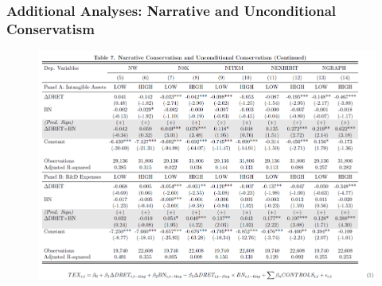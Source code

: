 \documentclass{beamer}
\begin{document}
\begin{frame}
	\frametitle{Additional Analyses: Narrative and Unconditional Conservatism}
	\begin{figure}[h]
		\centering
		\includegraphics[width=0.8\linewidth]{tab7_cont}
		\label{tab7_cont}
	\end{figure}
	
\end{frame}
%	
\end{document}
